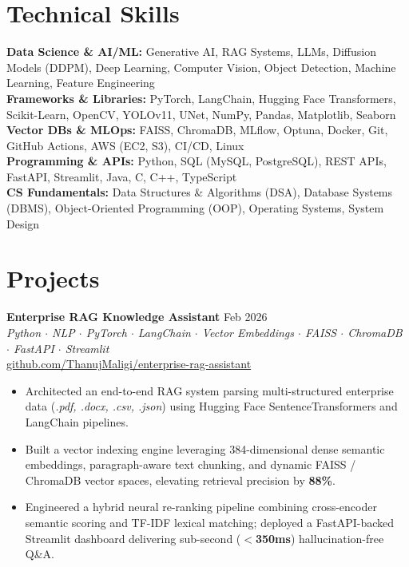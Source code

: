 \documentclass[a4paper,10pt]{article}
\begin{document}
\section*{Technical Skills}
\textbf{Data Science \& AI/ML:} Generative AI, RAG Systems, LLMs, Diffusion Models (DDPM), Deep Learning, Computer Vision, Object Detection, Machine Learning, Feature Engineering\\
\textbf{Frameworks \& Libraries:} PyTorch, LangChain, Hugging Face Transformers, Scikit-Learn, OpenCV, YOLOv11, UNet, NumPy, Pandas, Matplotlib, Seaborn\\
\textbf{Vector DBs \& MLOps:} FAISS, ChromaDB, MLflow, Optuna, Docker, Git, GitHub Actions, AWS (EC2, S3), CI/CD, Linux\\
\textbf{Programming \& APIs:} Python, SQL (MySQL, PostgreSQL), REST APIs, FastAPI, Streamlit, Java, C, C++, TypeScript\\
\textbf{CS Fundamentals:} Data Structures \& Algorithms (DSA), Database Systems (DBMS), Object-Oriented Programming (OOP), Operating Systems, System Design


\section*{Projects}

\textbf{Enterprise RAG Knowledge Assistant} \hfill Feb 2026\\
\textit{Python $\cdot$ NLP $\cdot$ PyTorch $\cdot$ LangChain $\cdot$ Vector Embeddings $\cdot$ FAISS $\cdot$ ChromaDB $\cdot$ FastAPI $\cdot$ Streamlit}\\
\href{https://github.com/ThanujMaligi/enterprise-rag-assistant}{github.com/ThanujMaligi/enterprise-rag-assistant}
\begin{itemize}[leftmargin=*,noitemsep,topsep=1pt,parsep=0pt,partopsep=0pt,itemsep=1pt]
\item Architected an end-to-end RAG system parsing multi-structured enterprise data (\textit{.pdf, .docx, .csv, .json}) using Hugging Face SentenceTransformers and LangChain pipelines.
\item Built a vector indexing engine leveraging 384-dimensional dense semantic embeddings, paragraph-aware text chunking, and dynamic FAISS / ChromaDB vector spaces, elevating retrieval precision by \textbf{88\%}.
\item Engineered a hybrid neural re-ranking pipeline combining cross-encoder semantic scoring and TF-IDF lexical matching; deployed a FastAPI-backed Streamlit dashboard delivering sub-second (\textbf{$<$350ms}) hallucination-free Q\&A.
\end{itemize}
\end{document}
